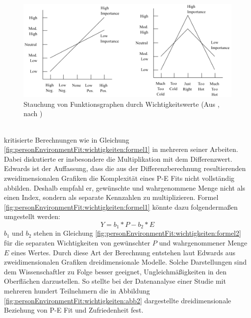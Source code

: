 \begin{figure}[h]
	\centering
	\includegraphics[width=1\textwidth]{gfx/Locke.png}
	\caption{Stauchung von Funktionsgraphen durch Wichtigkeitswerte (Aus \cite[S. 13f.]{edwards:2008}, nach \cite[S. 1305]{locke:1976})}
	\label{fig:personEnvironmentFit:wichtigkeiten:abb1}
\end{figure}\\
\textcite[S. 51ff.]{edwards:1991}\cite[S. 9ff.]{edwards:1990} kritisierte Berechnungen wie in Gleichung \ref{fig:personEnvironmentFit:wichtigkeiten:formel1} in mehreren seiner Arbeiten. Dabei diskutierte er insbesondere die Multiplikation mit dem Differenzwert. Edwards ist der Auffassung, dass die aus der Differenzberechnung resultierenden zweidimensionalen Grafiken die Komplexität eines P-E Fits nicht vollständig abbilden. Deshalb empfahl er, gewünschte und wahrgenommene Menge nicht als einen Index, sondern als separate Kennzahlen zu multiplizieren. Formel \ref{fig:personEnvironmentFit:wichtigkeiten:formel1} könnte dazu folgendermaßen umgestellt werden:
\begin{equation}
	Y = b_1 * P - b_2 * E
	\label{fig:personEnvironmentFit:wichtigkeiten:formel2}
\end{equation}
$b_1$ und $b_2$ stehen in Gleichung \ref{fig:personEnvironmentFit:wichtigkeiten:formel2} für die separaten Wichtigkeiten von gewünschter $P$ und wahrgenommener Menge $E$ eines Wertes. Durch diese Art der Berechnung entstehen laut Edwards aus zweidimensionalen Grafiken dreidimensionale Modelle. Solche Darstellungen sind dem Wissenschaftler zu Folge besser geeignet, Ungleichmäßigkeiten in den Oberflächen darzustellen. So stellte \textcite[S. 53ff.]{edwards:1991} bei der Datenanalyse einer Studie mit mehreren hundert Teilnehmern die in Abbildung \ref{fig:personEnvironmentFit:wichtigkeiten:abb2} dargestellte dreidimensionale Beziehung von P-E Fit und Zufriedenheit fest.\\
